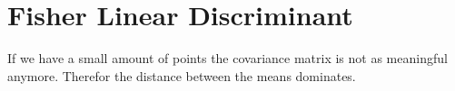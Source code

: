 \section*{Fisher Linear Discriminant}
If we have a small amount of points the covariance matrix is not as meaningful anymore. Therefor the distance between the means dominates.

